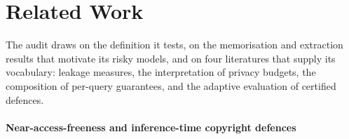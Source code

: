 \section{Related Work}\label{sec:related}

The audit draws on the definition it tests, on the memorisation and extraction results that motivate its risky models, and on four literatures that supply its vocabulary: leakage measures, the interpretation of privacy budgets, the composition of per-query guarantees, and the adaptive evaluation of certified defences.

\paragraph{Near-access-freeness and inference-time copyright defences}
